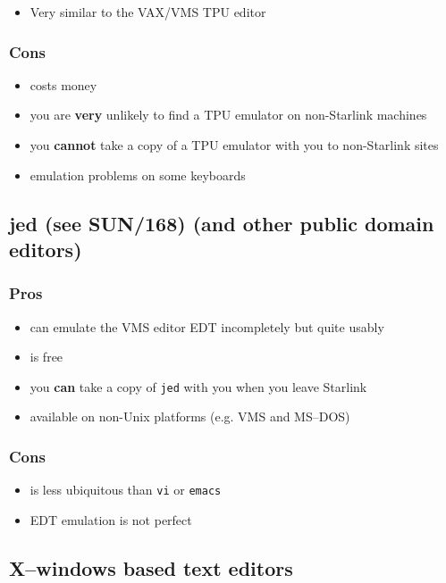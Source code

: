 \documentclass[twoside,11pt]{article}
\newcommand{\xref}[3]{#1}
\newcommand{\xlabel}[1]{}
\begin{document}
\begin{itemize}
\item Very similar to the VAX/VMS TPU editor
\end{itemize}

\subsubsection*{Cons}

\begin{itemize}
\item costs money
\item you are {\bf very} unlikely to find a TPU emulator on non-Starlink machines
\item you {\bf cannot} take a copy of a TPU emulator with you to non-Starlink sites
\item emulation problems on some keyboards
\end{itemize}

\subsection{\xlabel{jed}jed (see
\xref{SUN/168}{sun168}{}) (and other public domain editors)}

\subsubsection*{Pros}

\begin{itemize}
\item can emulate the VMS editor EDT incompletely but quite usably
\item is free
\item you {\bf can} take a copy of \verb|jed| with you when you leave Starlink
\item available on non-Unix platforms (e.g. VMS and MS--DOS)
\end{itemize}

\subsubsection*{Cons}
\begin{itemize}
\item is less ubiquitous than \verb|vi| or \verb|emacs|
\item EDT emulation is not perfect 
\end{itemize}


\subsection{\xlabel{xwindows_based_text_editors}X--windows based text editors}
\end{document}
